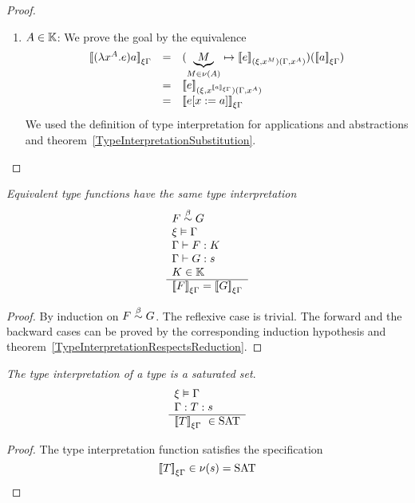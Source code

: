 \begin{theorem}
\begin{proof}
\begin{enumerate}
        \item $A \in \mathbb{K}$: We prove the goal by the equivalence
            $$
            \begin{array}{lll}
                \typeinter{(\lambda x^A.e)a}{\xi\Gamma}
                &=&
                (
                    \underbrace M_{M \in \nu(A)}
                    \mapsto
                    \typeinter{e}{(\xi,x^M)(\Gamma,x^A)}
                )
                (
                    \typeinter{a}{\xi\Gamma}
                )
                \\
                &=&
                \typeinter
                {e}
                {(\xi,x^{\typeinter{a}{\xi\Gamma}})(\Gamma,x^A)}
                \\
                &=&
                \typeinter{e[x:=a]}{\xi\Gamma}
            \end{array}
            $$
            We used the definition of type interpretation for applications and
                abstractions and
                theorem~\ref{TypeInterpretationSubstitution}.
        \end{enumerate}
    \end{proof}
\end{theorem}





\begin{theorem}
    \label{TypeInterpretationEquivalence}
    \emph{Equivalent type functions have the same type interpretation}
    $$
    \begin{array}{l} 
        F \stackrel{\beta}{\sim} G
        \\
        \xi \vDash \Gamma
        \\
        \Gamma \vdash F : K
        \\
        \Gamma \vdash G : s
        \\
        K \in \mathbb{K}
     \\ \hline 
        {{[\![}F{]\!]}}_{\xi\Gamma} = {{[\![} G{]\!]}}_{\xi\Gamma}
    \end{array}
    $$
    \begin{proof} By induction on $F \stackrel{\beta}{\sim} G$. The reflexive case is trivial.
        The forward and the backward cases can be proved by the corresponding
        induction hypothesis and
        theorem~\ref{TypeInterpretationRespectsReduction}.
    \end{proof}
\end{theorem}


\begin{theorem}
    \label{TypeInterpretationTypeSaturated}
    \emph{The type interpretation of a type is a saturated set}.
    $$
    \rulev{
        \xi \vDash \Gamma
        \\
        \Gamma: T : s
    }
    {
        \typeinter{T}{\xi\Gamma} \in \SAT
    }
    $$
    \begin{proof}
        The type interpretation function satisfies the specification
        $$
        {{[\![} T{]\!]}}_{\xi\Gamma} \in \nu(s) = \text{SAT}
        $$
    \end{proof}
\end{theorem}


